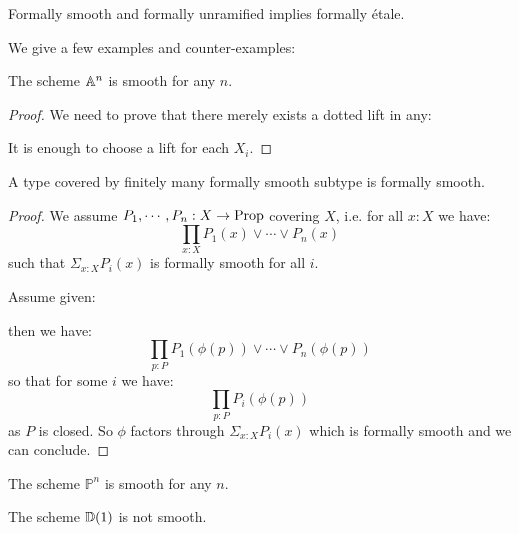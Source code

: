 \begin{remark}
Formally smooth and formally unramified implies formally étale.
\end{remark}

We give a few examples and counter-examples:

\begin{lemma}
The scheme $\mathbb{A}^n$ is smooth for any $n$.
\end{lemma}

\begin{proof}
We need to prove that there merely exists a dotted lift in any:
 \begin{center}
    \end{center}
    It is enough to choose a lift for each $X_i$.
\end{proof}

\begin{lemma}
A type covered by finitely many formally smooth subtype is formally smooth.
\end{lemma}
\begin{proof}
We assume $P_1,\cdots,P_n:X\to \mathrm{Prop}$ covering $X$, i.e. for all $x:X$ we have:
\[
\prod_{x:X}P_1(x)\lor\cdots\lor P_n(x)
\]
such that $\Sigma_{x:X}P_i(x)$ is formally smooth for all $i$.

Assume given:
   \begin{center}
    \end{center}
   then we have:
   \[\prod_{p:P} P_1(\phi(p))\lor\cdots\lor P_n(\phi(p))\]
   so that for some $i$ we have:
      \[\prod_{p:P} P_i(\phi(p))\]
as $P$ is closed. So $\phi$ factors through $\Sigma_{x:X}P_i(x)$ which is formally smooth and we can conclude. %
\end{proof}

\begin{corollary}
The scheme $\mathbb{P}^n$ is smooth for any $n$.
\end{corollary}

\begin{lemma}
The scheme $\mathbb{D}(1)$ is not smooth.
\end{lemma}

